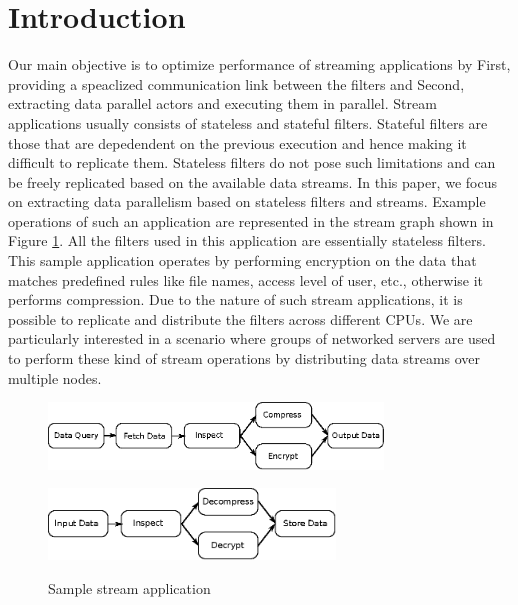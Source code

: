 \documentclass[10pt, conference, compsocconf, reqno]{IEEEtran}
\newcommand{\comment}[1]{}
\begin{document}

\comment{
With the continuing improvement of multicore and many-core architectures, it is becoming essential to improve the processing speeds of packet operations along with those of the application in order to scale performance.
}
\comment{
When performing packet processing operations for communication intensive stream applications, a major challenge is the high levels of performance required. These applications process large numbers of data streams in real time.  If the communication system cannot keep up with the rate at which packets arrive, then they must be dropped or remain unprocessed.
}

\section{Introduction}

Our main objective is to optimize performance of streaming applications by First, providing a speaclized communication link between the filters and Second, extracting data parallel actors and executing them in parallel. Stream applications usually consists of stateless and stateful filters. Stateful filters are those that are depedendent on the previous execution and hence making it difficult to replicate them. Stateless filters do not pose such limitations and can be freely replicated based on the available data streams. In this paper, we focus on extracting data parallelism based on stateless filters and streams. Example operations of such an application are represented in the stream graph shown in Figure \ref{fig1}. All the filters used in this application are essentially stateless filters. This sample application operates by performing encryption on the data that matches predefined rules like file names, access level of user, etc., otherwise it performs compression. Due to the nature of such stream applications, it is possible to replicate and distribute the filters across different CPUs. We are particularly interested in a scenario where groups of networked servers are used to perform these kind of stream operations by distributing data streams over multiple nodes.

\begin{figure}[ht]
\centering
\subfigure
{
	\includegraphics[width=3.5in]{ip-data-proc}
}

\subfigure
{
	\includegraphics[width=3in]{op-data-proc}
}
\caption{Sample stream application}
\label{fig1}
\end{figure}
\end{document}
